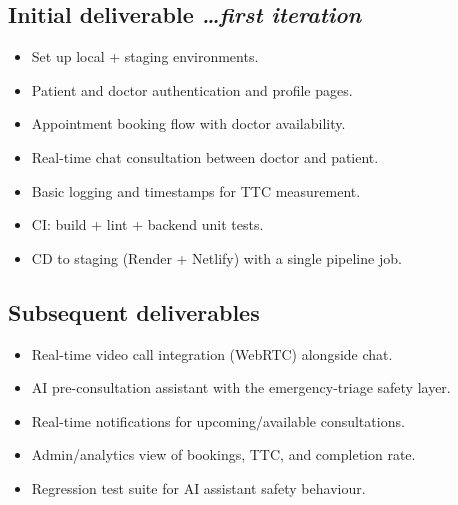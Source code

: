 \documentclass[11pt,a4paper]{article}
\newcommand{\BvrHint}[1]{%
{\normalfont\normalsize\itshape\hfill #1}}
\begin{document}
\subsection{Initial deliverable %
\BvrHint{\ldots first iteration}}
\begin{itemize}[leftmargin=0.7cm]
\item Set up local + staging environments.
\item Patient and doctor authentication and profile pages.
\item Appointment booking flow with doctor availability.
\item Real-time chat consultation between doctor and patient.
\item Basic logging and timestamps for TTC measurement.
\item CI: build + lint + backend unit tests.
\item CD to staging (Render + Netlify) with a single pipeline job.
\end{itemize}

\subsection{Subsequent deliverables}
\begin{itemize}[leftmargin=0.7cm]
\item Real-time video call integration (WebRTC) alongside chat.
\item AI pre-consultation assistant with the emergency-triage safety layer.
\item Real-time notifications for upcoming/available consultations.
\item Admin/analytics view of bookings, TTC, and completion rate.
\item Regression test suite for AI assistant safety behaviour.
\end{itemize}
\end{document}
